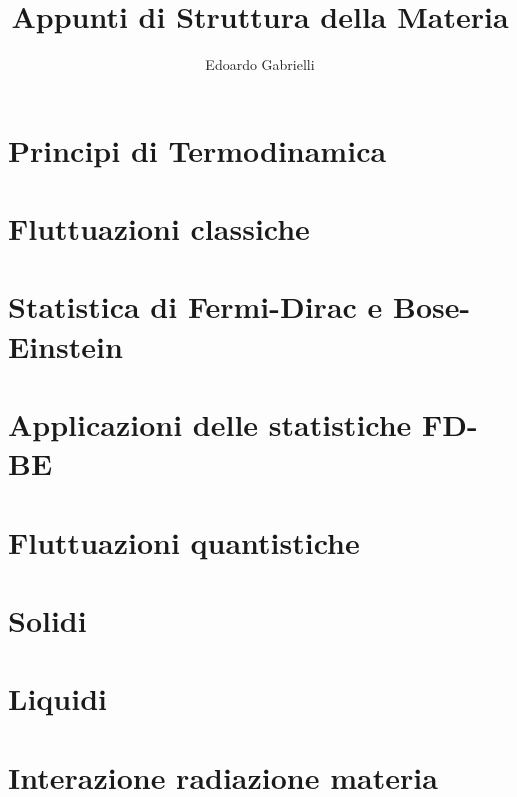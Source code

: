 

\author{Edoardo Gabrielli}
\title{Appunti di Struttura della Materia}


\maketitle
\clearpage
\tableofcontents
\chapter{Principi di Termodinamica}





\chapter{Fluttuazioni classiche}

\chapter{Statistica di Fermi-Dirac e Bose-Einstein}



\chapter{Applicazioni delle statistiche FD-BE}




\chapter{Fluttuazioni quantistiche}


\chapter{Solidi}



\chapter{Liquidi}





\chapter{Interazione radiazione materia}



 

